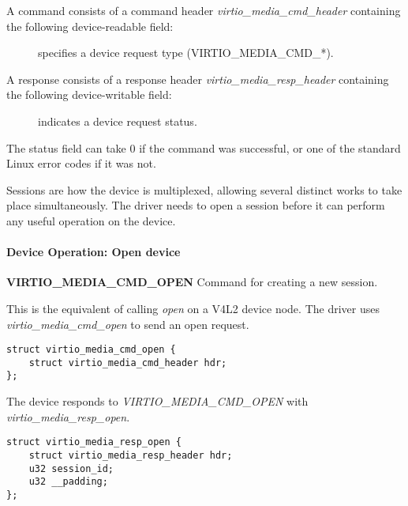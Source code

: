 A command consists of a command header \textit{virtio_media_cmd_header}
containing the following device-readable field:

\begin{description}
\item[] specifies a device request type (VIRTIO_MEDIA_CMD_*).
\end{description}

A response consists of a response header \textit{virtio_media_resp_header}
containing the following device-writable field:

\begin{description}
\item[] indicates a device request status.
\end{description}

The status field can take 0 if the command was successful, or one of the
standard Linux error codes if it was not.


Sessions are how the device is multiplexed, allowing several distinct works to
take place simultaneously. The driver needs to open a session before it can
perform any useful operation on the device.

\paragraph{Device Operation: Open device}

\textbf{VIRTIO_MEDIA_CMD_OPEN} Command for creating a new session.

This is the equivalent of calling \textit{open} on a V4L2 device node.
The driver uses \textit{virtio_media_cmd_open} to send an open request.

\begin{lstlisting}
struct virtio_media_cmd_open {
    struct virtio_media_cmd_header hdr;
};
\end{lstlisting}

The device responds to \textit{VIRTIO_MEDIA_CMD_OPEN} with \textit{virtio_media_resp_open}.

\begin{lstlisting}
struct virtio_media_resp_open {
    struct virtio_media_resp_header hdr;
    u32 session_id;
    u32 __padding;
};
\end{lstlisting}


